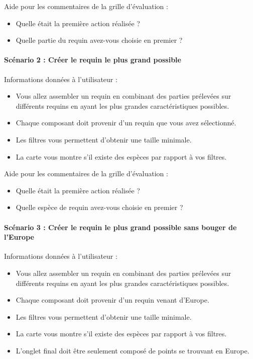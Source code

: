 \documentclass{article}
\begin{document}
Aide pour les commentaires de la grille d'évaluation :
\begin{itemize}
	\item Quelle était la première action réalisée ?
	\item Quelle partie du requin avez-vous choisie en premier ?
\end{itemize}

\paragraph{Scénario 2 : Créer le requin le plus grand possible}
Informations données à l'utilisateur :
\begin{itemize}
	\item Vous allez assembler un requin en combinant des parties prélevées sur différents requins en ayant les plus grandes caractéristiques possibles.
	\item Chaque composant doit provenir d'un requin que vous avez sélectionné.
	\item Les filtres vous permettent d'obtenir une taille minimale.
	\item La carte vous montre s'il existe des espèces par rapport à vos filtres.
\end{itemize}

Aide pour les commentaires de la grille d'évaluation :
\begin{itemize}
	\item Quelle était la première action réalisée ?
	\item Quelle espèce de requin avez-vous choisie en premier ?
\end{itemize}

\paragraph{Scénario 3 : Créer le requin le plus grand possible sans bouger de l'Europe}
Informations données à l'utilisateur :
\begin{itemize}
	\item Vous allez assembler un requin en combinant des parties prélevées sur différents requins en ayant les plus grandes caractéristiques possibles.
	\item Chaque composant doit provenir d'un requin venant d'Europe.
	\item Les filtres vous permettent d'obtenir une taille minimale.
	\item La carte vous montre s'il existe des espèces par rapport à vos filtres.
	\item L'onglet final doit être seulement composé de points se trouvant en Europe.
\end{itemize}
\end{document}
